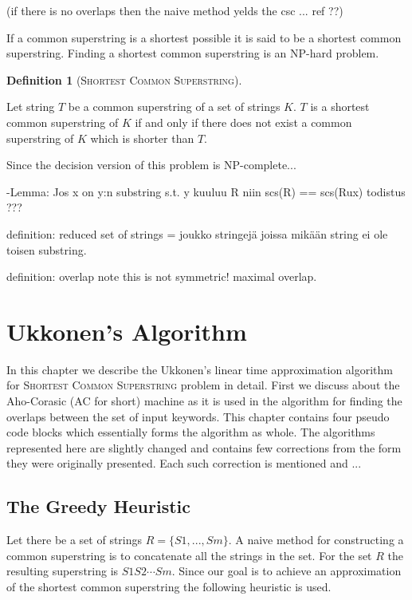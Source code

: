 \documentclass[english,twoside,censored,csm,algorithms-track-2020]{HYthesisML}
\theoremstyle{plain}
\theoremstyle{definition}
\newtheorem{definition}[equation]{Definition}
\begin{document}
(if there is no overlaps then the naive method yelds the csc ... ref ??)

If a common superstring is a shortest possible it is said to be a shortest common superstring. Finding a shortest common superstring is
an \textsc{NP}-hard problem. 

\begin{definition}[\textsc{Shortest Common Superstring}]~\label{def-scs}

  Let string $T$ be a common superstring of a set of strings $K$.
  $T$ is a shortest common superstring of $K$ if and only if there does not exist a common superstring of $K$ which is shorter than $T$.
  
\end{definition}

Since the decision version of this problem is NP-complete... \citep{Garey79}

-Lemma: Jos x on y:n substring s.t. y kuuluu R niin scs(R) == scs(Rux)
todistus ???

definition: reduced set of strings = joukko stringejä joissa mikään string ei ole toisen substring.

definition: overlap note this is not symmetric!
maximal overlap.


\chapter{Ukkonen's Algorithm}

In this chapter we describe the Ukkonen's linear time approximation algorithm for
\textsc{Shortest Common Superstring} problem in detail. First we discuss about the
Aho-Corasic (AC for short) machine as it is used in the algorithm for finding the overlaps
between the set of input keywords. This chapter contains four pseudo code blocks which
essentially forms the algorithm as whole. The algorithms represented here are slightly changed
and contains few corrections from the form they were originally presented. Each such
correction is mentioned and ...

\listofalgorithms

\section{The Greedy Heuristic}

Let there be a set of strings $R=\{S1,...,Sm\}$. A naive method for constructing a common superstring is
to concatenate all the strings in the set. For the set $R$ the resulting superstring is $S1S2\cdots Sm$.
Since our goal is to achieve an approximation of the shortest common superstring the following heuristic
is used.
\end{document}
